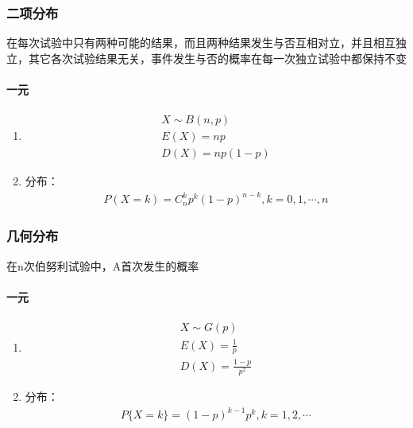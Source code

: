 \documentclass[12pt]{book}
\begin{document}
\subsubsection{二项分布}

在每次试验中只有两种可能的结果，而且两种结果发生与否互相对立，并且相互独立，其它各次试验结果无关，事件发生与否的概率在每一次独立试验中都保持不变

\paragraph{一元}

\begin{enumerate}[1.]
    \item
          \begin{gather*}
              X\sim B(n,p) \\
              E(X)=np \\
              D(X)=np(1-p)
          \end{gather*}
    \item 分布：
          \begin{gather*}
              P(X=k)= C_{n}^{k} p^{k} (1-p)^{n-k}, k=0,1,\cdots,n
          \end{gather*}
\end{enumerate}

\subsubsection{几何分布}

在n次伯努利试验中，A首次发生的概率


\paragraph{一元} 


\begin{enumerate}[1.]
    \item \begin{gather*}
              X\sim G(p) \\
              E(X)=\frac{1}{p} \\
              D(X)=\frac{1-p}{p^2}
          \end{gather*}
    \item 分布：
          \begin{gather*}
              P\{X=k\}=(1-p)^{k-1} p^k, k=1,2,\cdots
          \end{gather*}
\end{enumerate}
\end{document}
